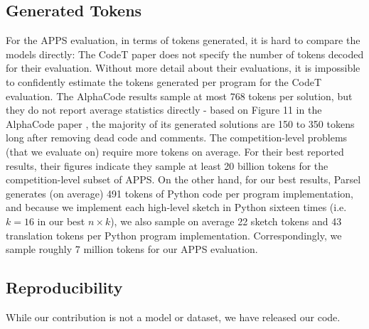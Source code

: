 \subsection{Generated Tokens}
\label{tokencounts}
For the APPS evaluation, in terms of tokens generated, it is hard to compare the models directly: The CodeT paper does not specify the number of tokens decoded for their evaluation. Without more detail about their evaluations, it is impossible to confidently estimate the tokens generated per program for the CodeT evaluation. The AlphaCode results sample at most 768 tokens per solution, but they do not report average statistics directly - based on Figure 11 in the AlphaCode paper \citep{li2022competition}, the majority of its generated solutions are 150 to 350 tokens long after removing dead code and comments. The competition-level problems (that we evaluate on) require more tokens on average. For their best reported results, their figures indicate they sample at least 20 billion tokens for the competition-level subset of APPS. On the other hand, for our best results, Parsel generates (on average) 491 tokens of Python code per program implementation, and because we implement each high-level sketch in Python sixteen times (i.e. $k=16$ in our best $n\times k$), we also sample on average 22 sketch tokens and 43 translation tokens per Python program implementation. Correspondingly, we sample roughly 7 million tokens for our APPS evaluation.


\subsection{Reproducibility}
While our contribution is not a model or dataset, we have released our code.